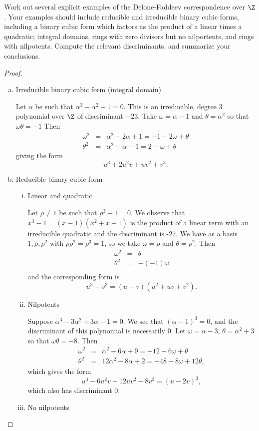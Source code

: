\documentclass[10pt]{amsart}
\begin{document}
\setcounter{thm}{8}
\begin{thm}
  Work out several explicit examples of the Delone-Faddeev correspondence over $\Z$.
  Your examples should include reducible and irreducible binary cubic forms, including a binary cubic form which factors as the product of a linear times a quadratic; integral domains, rings with zero divisors but no nilportents, and rings with nilpotents.
  Compute the relevant discriminants, and summarize your conclusions.
  
  \begin{proof}
    \begin{enumerate}[(a)]
    \item Irreducible binary cubic form (integral domain)
      
      Let $\alpha$ be such that $\alpha^3 - \alpha^2 + 1 = 0$.
      This is an irreducible, degree 3 polynomial over $\Z$ of discriminant $-23$.
      Take $\omega = \alpha - 1$ and $\theta = \alpha^2$ so that $\omega\theta = -1$
      Then 
      \begin{eqnarray*}
        \omega^2 &=& \alpha^2 - 2\alpha + 1 = -1 - 2\omega + \theta\\
        \theta^2 &=& \alpha^2 - \alpha - 1 = 2 - \omega + \theta
      \end{eqnarray*}
      giving the form
      $$u^3 + 2u^2v + uv^2 + v^3.$$
    \item Reducible binary cubic form
      \begin{enumerate}[(i)]
      \item
        Linear and quadratic
        
        Let $\rho \neq 1$ be such that $\rho^3 - 1 = 0$.
        We observe that $x^3 - 1 = (x - 1)(x^2 + x + 1)$ is the product of a linear term with an irreducible quadratic and the discriminant is -27.
        We have as a basis ${1, \rho, \rho^2}$ with $\rho\rho^2 = \rho^3 = 1$, so we take $\omega = \rho$ and $\theta = \rho^2$.
        Then
        \begin{eqnarray*}
          \omega^2 &=& \theta\\
          \theta^2 &=& -(-1)\omega\\
        \end{eqnarray*}
        and the corresponding form is
        $$u^3 - v^3 = (u - v)(u^2 + uv + v^2).$$
      \item Nilpotents
        
        Suppose $\alpha^3 - 3\alpha^2 + 3\alpha - 1 = 0$.
        We see that $(\alpha - 1)^3 = 0$, and the discriminant of this polynomial is necessarily 0.
        Let $\omega = \alpha - 3$, $\theta = \alpha^2 + 3$ so that $\omega\theta = -8$.
        Then 
        \begin{eqnarray*}
          \omega^2 &=& \alpha^2 - 6\alpha + 9  = -12 - 6\omega + \theta\\
          \theta^2 &=& 12\alpha^2 -8\alpha + 2 = -48 -8\omega + 12\theta,
        \end{eqnarray*}
        which gives the form
        $$u^3 - 6u^2v + 12uv^2 - 8v^3 = (u - 2v)^3,$$
        which also has discriminant 0.
      \item No nilpotents
        

\end{enumerate}
\end{enumerate}
\end{proof}
\end{thm}
\end{document}
